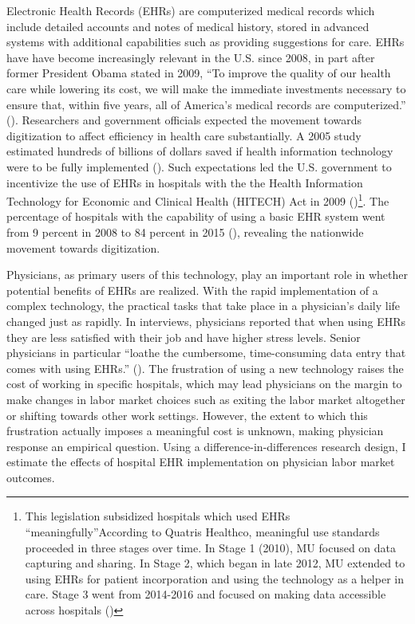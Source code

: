 \documentclass[11pt]{article}
\begin{document}
Electronic Health Records (EHRs) are computerized medical records which include detailed accounts and notes of medical history, stored in advanced systems with additional capabilities such as providing suggestions for care. EHRs have have become increasingly relevant in the U.S. since 2008, in part after former President Obama stated in 2009, “To improve the quality of our health care while lowering its cost, we will make the immediate investments necessary to ensure that, within five years, all of America’s medical records are computerized.” (\cite{presquote}). Researchers and government officials expected the movement towards digitization to affect efficiency in health care substantially. A 2005 study estimated hundreds of billions of dollars saved if health information technology were to be fully implemented (\cite{hillestad2005}). Such expectations led the U.S. government to incentivize the use of EHRs in hospitals with the the Health Information Technology for Economic and Clinical Health (HITECH) Act in 2009 (\cite{hitech})\footnote{This legislation subsidized hospitals which used EHRs “meaningfully”According to Quatris Healthco, meaningful use standards proceeded in three stages over time. In Stage 1 (2010), MU focused on data capturing and sharing. In Stage 2, which began in late 2012, MU extended to using EHRs for patient incorporation and using the technology as a helper in care. Stage 3 went from 2014-2016 and focused on making data accessible across hospitals (\cite{meanuse})}. The percentage of hospitals with the capability of using a basic EHR system went from 9 percent in 2008 to 84 percent in 2015 (\cite{stats}), revealing the nationwide movement towards digitization.

Physicians, as primary users of this technology, play an important role in whether potential benefits of EHRs are realized. With the rapid implementation of a complex technology, the practical tasks that take place in a physician's daily life changed just as rapidly. In interviews, physicians reported that when using EHRs they are less satisfied with their job and have higher stress levels. Senior physicians in particular “loathe the cumbersome, time-consuming data entry that comes with using EHRs.” (\cite{CollierBurnout}). The frustration of using a new technology raises the cost of working in specific hospitals, which may lead physicians on the margin to make changes in labor market choices such as exiting the labor market altogether or shifting towards other work settings. However, the extent to which this frustration actually imposes a meaningful cost is unknown, making physician response an empirical question. Using a difference-in-differences research design, I estimate the effects of hospital EHR implementation on physician labor market outcomes.
\end{document}
